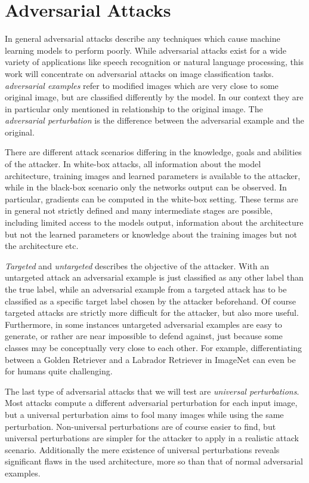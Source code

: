 
\section{Adversarial Attacks}
\label{sec:attacks}

In general adversarial attacks describe any techniques which cause machine learning models to perform poorly.
While adversarial attacks exist for a wide variety of applications like speech recognition or natural language processing, this work will concentrate on adversarial attacks on image classification tasks.
\emph{adversarial examples} refer to modified images which are very close to some original image, but are classified differently by the model.
In our context they are in particular only mentioned in relationship to the original image.
The \emph{adversarial perturbation} is the difference between the adversarial example and the original.

There are different attack scenarios differing in the knowledge, goals and abilities of the attacker.
In white-box attacks, all information about the model architecture, training images and learned parameters is available to the attacker, while in the black-box scenario only the networks output can be observed.
In particular, gradients can be computed in the white-box setting.
These terms are in general not strictly defined and many intermediate stages are possible, including limited access to the models output, information about the architecture but not the learned parameters or knowledge about the training images but not the architecture etc.

\emph{Targeted} and \emph{untargeted} describes the objective of the attacker.
With an untargeted attack an adversarial example is just classified as any other label than the true label, while an adversarial example from a targeted attack has to be classified as a specific target label chosen by the attacker beforehand.
Of course targeted attacks are strictly more difficult for the attacker, but also more useful.
Furthermore, in some instances untargeted adversarial examples are easy to generate, or rather are near impossible to defend against, just because some classes may be conceptually very close to each other.
For example, differentiating between a Golden Retriever and a Labrador Retriever in ImageNet \citep{imagenet} can even be for humans quite challenging.

The last type of adversarial attacks that we will test are \emph{universal perturbations}. Most attacks compute a different adversarial perturbation for each input image, but a universal perturbation aims to fool many images while using the same perturbation.
Non-universal perturbations are of course easier to find, but universal perturbations are simpler for the attacker to apply in a realistic attack scenario.
Additionally the mere existence of universal perturbations reveals significant flaws in the used architecture, more so than that of normal adversarial examples.

